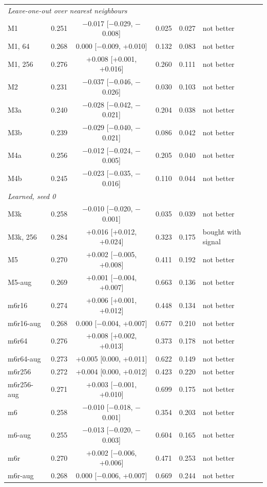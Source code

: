 \documentclass[preprint,12pt,authoryear]{elsarticle}
\begin{document}
\begin{table}[tbp]
\begin{tabular}{lccccl}
    \multicolumn{6}{l}{\textit{Leave-one-out over nearest neighbours}} \\
    M1 & 0.251 & $-$0.017 [$-$0.029, $-$0.008] & 0.025 & 0.027 & not better \\
    M1, 64 & 0.268 & 0.000 [$-$0.009, +0.010] & 0.132 & 0.083 & not better \\
    M1, 256 & 0.276 & +0.008 [+0.001, +0.016] & 0.260 & 0.111 & not better \\
    M2 & 0.231 & $-$0.037 [$-$0.046, $-$0.026] & 0.030 & 0.103 & not better \\
    M3a & 0.240 & $-$0.028 [$-$0.042, $-$0.021] & 0.204 & 0.038 & not better \\
    M3b & 0.239 & $-$0.029 [$-$0.040, $-$0.021] & 0.086 & 0.042 & not better \\
    M4a & 0.256 & $-$0.012 [$-$0.024, $-$0.005] & 0.205 & 0.040 & not better \\
    M4b & 0.245 & $-$0.023 [$-$0.035, $-$0.016] & 0.110 & 0.044 & not better \\
    \multicolumn{6}{l}{\textit{Learned, seed 0}} \\
    M3k & 0.258 & $-$0.010 [$-$0.020, $-$0.001] & 0.035 & 0.039 & not better \\
    M3k, 256 & 0.284 & +0.016 [+0.012, +0.024] & 0.323 & 0.175 & bought with signal \\
    M5 & 0.270 & +0.002 [$-$0.005, +0.008] & 0.411 & 0.192 & not better \\
    M5-aug & 0.269 & +0.001 [$-$0.004, +0.007] & 0.663 & 0.136 & not better \\
    m6r16 & 0.274 & +0.006 [+0.001, +0.012] & 0.448 & 0.134 & not better \\
    m6r16-aug & 0.268 & 0.000 [$-$0.004, +0.007] & 0.677 & 0.210 & not better \\
    m6r64 & 0.276 & +0.008 [+0.002, +0.013] & 0.373 & 0.178 & not better \\
    m6r64-aug & 0.273 & +0.005 [0.000, +0.011] & 0.622 & 0.149 & not better \\
    m6r256 & 0.272 & +0.004 [0.000, +0.012] & 0.423 & 0.220 & not better \\
    m6r256-aug & 0.271 & +0.003 [$-$0.001, +0.010] & 0.699 & 0.175 & not better \\
    m6 & 0.258 & $-$0.010 [$-$0.018, $-$0.001] & 0.354 & 0.203 & not better \\
    m6-aug & 0.255 & $-$0.013 [$-$0.020, $-$0.003] & 0.604 & 0.165 & not better \\
    m6r & 0.270 & +0.002 [$-$0.006, +0.006] & 0.471 & 0.253 & not better \\
    m6r-aug & 0.268 & 0.000 [$-$0.006, +0.007] & 0.669 & 0.244 & not better \\
    \bottomrule
  \end{tabular}
\end{table}
\end{document}
